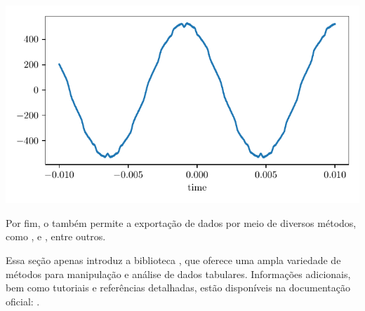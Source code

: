 \begin{center}
    \includegraphics[scale=1.0]{figs/back_emf}
\end{center}


Por fim, o  também permite a exportação de dados por meio de diversos métodos, como
,  e , entre outros.


Essa seção apenas introduz a biblioteca , que oferece uma ampla variedade de métodos
para manipulação e análise de dados tabulares.
Informações adicionais, bem como tutoriais e referências detalhadas, estão disponíveis na documentação oficial:
.
